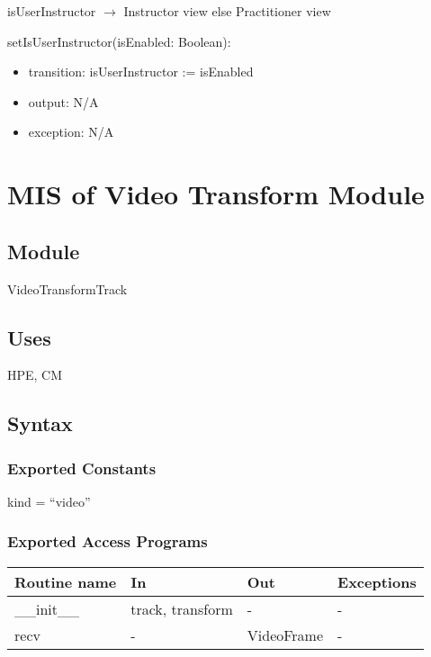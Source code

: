 \documentclass[12pt, titlepage]{article}
\begin{document}
\noindent isUserInstructor $\rightarrow$ Instructor view else Practitioner view

\noindent setIsUserInstructor(isEnabled: Boolean):
\begin{itemize}
  \item transition: isUserInstructor := isEnabled
  \item output: N/A
  \item exception: N/A
\end{itemize}

\section{MIS of Video Transform Module}
\label{sec:videotransform}

\subsection{Module}
VideoTransformTrack

\subsection{Uses}
HPE, CM

\subsection{Syntax}

\subsubsection{Exported Constants}
kind = ``video''

\subsubsection{Exported Access Programs}
\begin{table}[h!]
  \centering
  \begin{tabular}{llll}
    \toprule
    \textbf{Routine name} & \textbf{In}             & \textbf{Out}        & \textbf{Exceptions} \\
    \midrule
    \_\_init\_\_          & track, transform        & -                   & -                   \\
    recv                  & -                       & VideoFrame          & -                   \\
    \bottomrule
  \end{tabular}
\end{table}
\end{document}
